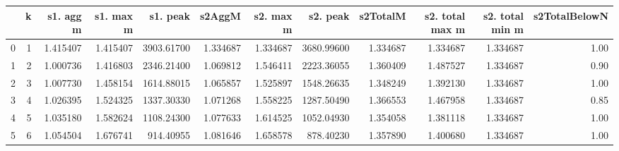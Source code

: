 \begin{tabular}{lrrrrrrrrrrr}
\toprule
{} &  k &  s1. agg m &  s1. max m &    s1. peak &    s2AggM &  s2. max m &    s2. peak &  s2TotalM &  s2. total max m &  s2. total min m &  s2TotalBelowN \\
\midrule
0 &  1 &   1.415407 &   1.415407 &  3903.61700 &  1.334687 &   1.334687 &  3680.99600 &  1.334687 &         1.334687 &         1.334687 &           1.00 \\
1 &  2 &   1.000736 &   1.416803 &  2346.21400 &  1.069812 &   1.546411 &  2223.36055 &  1.360409 &         1.487527 &         1.334687 &           0.90 \\
2 &  3 &   1.007730 &   1.458154 &  1614.88015 &  1.065857 &   1.525897 &  1548.26635 &  1.348249 &         1.392130 &         1.334687 &           1.00 \\
3 &  4 &   1.026395 &   1.524325 &  1337.30330 &  1.071268 &   1.558225 &  1287.50490 &  1.366553 &         1.467958 &         1.334687 &           0.85 \\
4 &  5 &   1.035180 &   1.582624 &  1108.24300 &  1.077633 &   1.614525 &  1052.04930 &  1.354058 &         1.381118 &         1.334687 &           1.00 \\
5 &  6 &   1.054504 &   1.676741 &   914.40955 &  1.081646 &   1.658578 &   878.40230 &  1.357890 &         1.400680 &         1.334687 &           1.00 \\
\bottomrule
\end{tabular}
